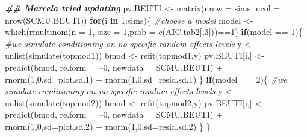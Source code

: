 \documentclass[
]{article}
\newenvironment{Shaded}{\begin{snugshade}}{\end{snugshade}}
\newcommand{\AttributeTok}[1]{\textcolor[rgb]{0.77,0.63,0.00}{#1}}
\newcommand{\CommentTok}[1]{\textcolor[rgb]{0.56,0.35,0.01}{\textit{#1}}}
\newcommand{\ControlFlowTok}[1]{\textcolor[rgb]{0.13,0.29,0.53}{\textbf{#1}}}
\newcommand{\DecValTok}[1]{\textcolor[rgb]{0.00,0.00,0.81}{#1}}
\newcommand{\DocumentationTok}[1]{\textcolor[rgb]{0.56,0.35,0.01}{\textbf{\textit{#1}}}}
\newcommand{\FloatTok}[1]{\textcolor[rgb]{0.00,0.00,0.81}{#1}}
\newcommand{\FunctionTok}[1]{\textcolor[rgb]{0.00,0.00,0.00}{#1}}
\newcommand{\NormalTok}[1]{#1}
\newcommand{\OtherTok}[1]{\textcolor[rgb]{0.56,0.35,0.01}{#1}}
\newcommand{\SpecialCharTok}[1]{\textcolor[rgb]{0.00,0.00,0.00}{#1}}
\begin{document}
\begin{Shaded}
\begin{Highlighting}[]
\DocumentationTok{\#\# Marcela tried updating}
\NormalTok{pv.BEUTI }\OtherTok{\textless{}{-}} \FunctionTok{matrix}\NormalTok{(}\AttributeTok{nrow =}\NormalTok{ sims, }\AttributeTok{ncol =} \FunctionTok{nrow}\NormalTok{(SCMU.BEUTI))}
\ControlFlowTok{for}\NormalTok{(i }\ControlFlowTok{in} \DecValTok{1}\SpecialCharTok{:}\NormalTok{sims)\{}
  \CommentTok{\#choose a model }
\NormalTok{  model }\OtherTok{\textless{}{-}} \FunctionTok{which}\NormalTok{(}\FunctionTok{rmultinom}\NormalTok{(}\AttributeTok{n =} \DecValTok{1}\NormalTok{, }\AttributeTok{size =} \DecValTok{1}\NormalTok{,}\AttributeTok{prob =} \FunctionTok{c}\NormalTok{(AIC.tab2[,}\DecValTok{3}\NormalTok{]))}\SpecialCharTok{==}\DecValTok{1}\NormalTok{)}
  \ControlFlowTok{if}\NormalTok{(model }\SpecialCharTok{==} \DecValTok{1}\NormalTok{)\{}
    \CommentTok{\#we simulate conditioning on no specific random effects levels}
\NormalTok{    y }\OtherTok{\textless{}{-}} \FunctionTok{unlist}\NormalTok{(}\FunctionTok{simulate}\NormalTok{(topmod1))}
\NormalTok{    bmod }\OtherTok{\textless{}{-}} \FunctionTok{refit}\NormalTok{(topmod1,y)}
\NormalTok{    pv.BEUTI[i,] }\OtherTok{\textless{}{-}} \FunctionTok{predict}\NormalTok{(bmod, }\AttributeTok{re.form =} \SpecialCharTok{\textasciitilde{}}\DecValTok{0}\NormalTok{, }\AttributeTok{newdata =}\NormalTok{ SCMU.BEUTI) }\SpecialCharTok{+} \FunctionTok{rnorm}\NormalTok{(}\DecValTok{1}\NormalTok{,}\DecValTok{0}\NormalTok{,}\AttributeTok{sd=}\NormalTok{plot.sd}\FloatTok{.1}\NormalTok{) }\SpecialCharTok{+} \FunctionTok{rnorm}\NormalTok{(}\DecValTok{1}\NormalTok{,}\DecValTok{0}\NormalTok{,}\AttributeTok{sd=}\NormalTok{resid.sd}\FloatTok{.1}\NormalTok{)}
\NormalTok{  \}}
  \ControlFlowTok{if}\NormalTok{(model }\SpecialCharTok{==} \DecValTok{2}\NormalTok{)\{}
    \CommentTok{\#we simulate conditioning on no specific random effects levels}
\NormalTok{    y }\OtherTok{\textless{}{-}} \FunctionTok{unlist}\NormalTok{(}\FunctionTok{simulate}\NormalTok{(topmod2))}
\NormalTok{    bmod }\OtherTok{\textless{}{-}} \FunctionTok{refit}\NormalTok{(topmod2,y)}
\NormalTok{    pv.BEUTI[i,] }\OtherTok{\textless{}{-}} \FunctionTok{predict}\NormalTok{(bmod, }\AttributeTok{re.form =} \SpecialCharTok{\textasciitilde{}}\DecValTok{0}\NormalTok{, }\AttributeTok{newdata =}\NormalTok{ SCMU.BEUTI) }\SpecialCharTok{+} \FunctionTok{rnorm}\NormalTok{(}\DecValTok{1}\NormalTok{,}\DecValTok{0}\NormalTok{,}\AttributeTok{sd=}\NormalTok{plot.sd}\FloatTok{.2}\NormalTok{) }\SpecialCharTok{+} \FunctionTok{rnorm}\NormalTok{(}\DecValTok{1}\NormalTok{,}\DecValTok{0}\NormalTok{,}\AttributeTok{sd=}\NormalTok{resid.sd}\FloatTok{.2}\NormalTok{)}
\NormalTok{  \}}
\NormalTok{\}  }
\end{Highlighting}
\end{Shaded}
\end{document}

